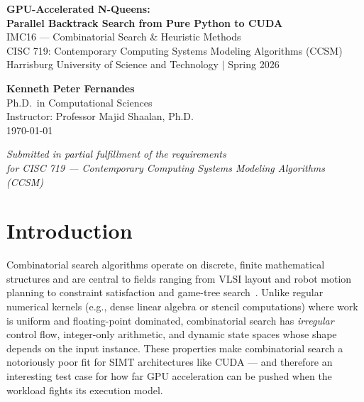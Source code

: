 \documentclass[12pt, letterpaper]{article}
\begin{document}
\begin{titlepage}
    \centering

    \vspace*{3.5cm}
    {\LARGE \textbf{GPU-Accelerated N-Queens:\\[0.3cm]
    Parallel Backtrack Search from Pure Python to CUDA}}\\[1.2cm]
    {\large IMC16 --- Combinatorial Search \& Heuristic Methods}\\[0.5cm]
    {\large CISC 719: Contemporary Computing Systems Modeling Algorithms (CCSM)}\\[0.4cm]
    {\large Harrisburg University of Science and Technology $|$ Spring 2026}

    \vspace{3.5cm}

    {\large \textbf{Kenneth Peter Fernandes}}\\[0.4cm]
    {\normalsize Ph.D.\ in Computational Sciences}\\[0.3cm]
    {\normalsize Instructor: Professor Majid Shaalan, Ph.D.}\\[0.6cm]
    {\large \today}

    \vfill

    \textit{Submitted in partial fulfillment of the requirements\\
    for CISC 719 --- Contemporary Computing Systems Modeling Algorithms (CCSM)}
    \vspace*{0.5cm}
\end{titlepage}

\tableofcontents
\newpage

\section{Introduction}
\label{sec:intro}

Combinatorial search algorithms operate on discrete, finite mathematical structures and are central to fields ranging from VLSI layout and robot motion planning to constraint satisfaction and game-tree search~\cite{quinn2004}. Unlike regular numerical kernels (e.g., dense linear algebra or stencil computations) where work is uniform and floating-point dominated, combinatorial search has \emph{irregular} control flow, integer-only arithmetic, and dynamic state spaces whose shape depends on the input instance. These properties make combinatorial search a notoriously poor fit for SIMT architectures like CUDA --- and therefore an interesting test case for how far GPU acceleration can be pushed when the workload fights its execution model.
\end{document}
